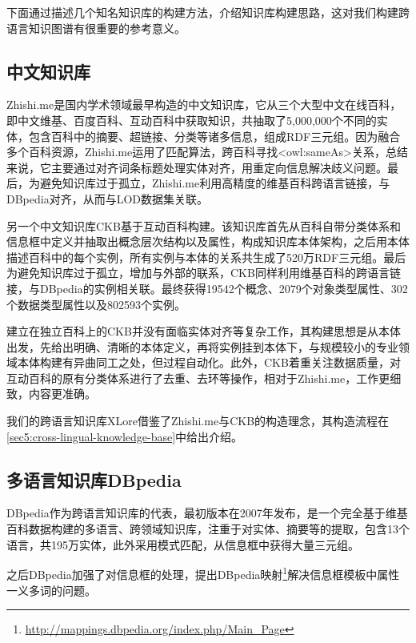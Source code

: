下面通过描述几个知名知识库的构建方法，介绍知识库构建思路，这对我们构建跨语言知识图谱有很重要的参考意义。

\subsection{中文知识库}

Zhishi.me\cite{niu2011zhishi,wang2014publishing}是国内学术领域最早构造的中文知识库，它从三个大型中文在线百科，即中文维基、百度百科、互动百科中获取知识，共抽取了5,000,000个不同的实体，包含百科中的摘要、超链接、分类等诸多信息，组成RDF三元组。因为融合多个百科资源，Zhishi.me运用了匹配算法，跨百科寻找<owl:sameAs>关系，总结来说，它主要通过对齐词条标题处理实体对齐，用重定向信息解决歧义问题。最后，为避免知识库过于孤立，Zhishi.me利用高精度的维基百科跨语言链接，与DBpedia对齐，从而与LOD数据集关联。

另一个中文知识库CKB\cite{wang2011building}基于互动百科构建。该知识库首先从百科自带分类体系和信息框中定义并抽取出概念层次结构以及属性，构成知识库本体架构，之后用本体描述百科中的每个实例，所有实例与本体的关系共生成了520万RDF三元组。最后为避免知识库过于孤立，增加与外部的联系，CKB同样利用维基百科的跨语言链接，与DBpedia的实例相关联。最终获得19542个概念、2079个对象类型属性、302个数据类型属性以及802593个实例。

建立在独立百科上的CKB并没有面临实体对齐等复杂工作，其构建思想是从本体出发，先给出明确、清晰的本体定义，再将实例挂到本体下，与规模较小的专业领域本体构建有异曲同工之处，但过程自动化。此外，CKB着重关注数据质量，对互动百科的原有分类体系进行了去重、去环等操作，相对于Zhishi.me，工作更细致，内容更准确。

我们的跨语言知识库XLore借鉴了Zhishi.me与CKB的构造理念，其构造流程在\ref{sec5:cross-lingual-knowledge-base}中给出介绍。

\subsection{多语言知识库DBpedia}
DBpedia作为跨语言知识库的代表，最初版本在2007年发布\cite{auer2007dbpedia}，是一个完全基于维基百科数据构建的多语言、跨领域知识库，注重于对实体、摘要等的提取，包含13个语言，共195万实体，此外采用模式匹配，从信息框中获得大量三元组。

之后DBpedia加强了对信息框的处理，提出DBpedia映射\footnote{\url{http://mappings.dbpedia.org/index.php/Main_Page}}解决信息框模板中属性一义多词的问题。


